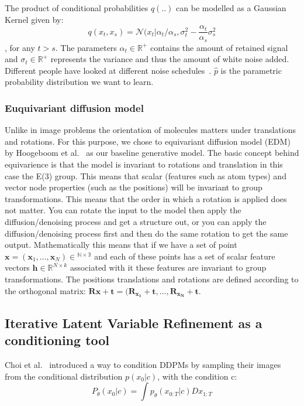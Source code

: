 \documentclass[journal=jacsat,manuscript=article]{achemso}
\begin{document}
The product of conditional probabilities $q(..)$ can be modelled as a Gaussian Kernel given by:
\begin{equation}
    q(x_t, x_s)=\mathcal{N}(x_t|\alpha_t/\alpha_s, \sigma_t^2-\frac{\alpha_t}{\alpha_s}\sigma^2_s
\end{equation},
for any $t> s$. The parameters $\alpha_t \in \mathbb{R}^+$ contains the amount of retained signal and $\sigma_t \in \mathbb{R}^+$ represents the variance and thus the amount of white noise added. 
Different people have looked at different noise schedules~\cite{sohl-dickstein2015deep, ho2020denoising}.
$\hat{p}$ is the parametric probability distribution we want to learn. 
\subsubsection*{Euquivariant diffusion model}
Unlike in image problems the orientation of molecules matters under translations and rotations. For this purpose, we chose to equivariant diffusion model (EDM) by Hoogeboom et al.~\cite{} as our baseline generative model. The basic concept behind equivarience is that the model is invariant to rotations and translation in this case the E(3) group. This means that scalar (features such as atom types) and vector node properties (such as the positions) will be invariant to group transformations. This means that the order in which a rotation is applied does not matter. You can rotate the input to the model then apply the diffusion/denoising process and get a structure out, or you can apply the diffusion/denoising process first and then do the same rotation to get the same output. 
Mathematically this means that if we have a set of point $\mathbf{x} = (\mathbf{x}_1,\ldots,\mathbf{x}_N) \in \mathbb{^{N\times 3}}$ and each of these points has a set of scalar feature vectors $\mathbf{h}\in \mathbb{R}^{N\times k}$ associated with it these features are invariant to group transformations. The positions translations and rotations are defined according to the orthogonal matrix: $\mathbf{Rx + t} = (\mathbf{R_{x_1}+t},\ldots, \mathbf{R_{x_N}+t}$.
\subsection{Iterative Latent Variable Refinement as a conditioning tool}
Choi et al.~\cite{choi2021ilvr} introduced a way to condition DDPMs by sampling their images from the conditional distribution $p(x_0|c)$, with the condition c:
\begin{equation}
    P_\theta(x_0|c) = \int p_\theta(x_{0:T}|c)Dx_{1:T}
\end{equation}
\end{document}
